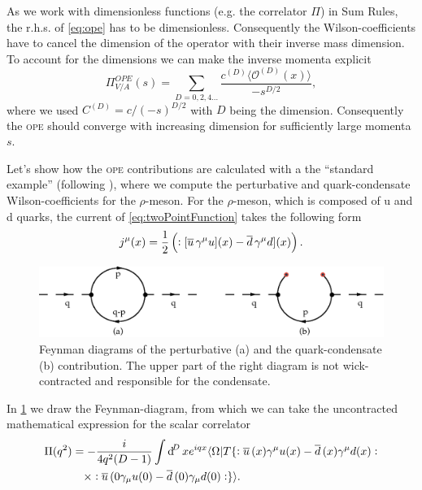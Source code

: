 \documentclass[../../index.tex]{subfiles}
\begin{document}
As we work with dimensionless functions (e.g. the correlator $\Pi$) in Sum
Rules, the r.h.s. of \cref{eq:ope} has to be dimensionless. Consequently the
Wilson-coefficients have to cancel the dimension of the operator with their
inverse mass dimension. To account for the dimensions we can make the inverse
momenta explicit
\begin{equation}
  \Pi_{V/A}^{OPE}(s) = \sum_{D=0,2,4\dots} \frac{c^{(D)} \langle \mathcal{O}^{(D)}(x) \rangle}{-s^{D/2}},
\end{equation}
where we used $C^{(D)}=c/(-s)^{D/2}$ with $D$ being the dimension. Consequently
the \textsc{ope} should converge with increasing dimension for sufficiently
large momenta $s$.

Let's show how the \textsc{ope} contributions are calculated with a the
``standard example'' (following \cite{Pascual1984}), where we compute the
perturbative and quark-condensate Wilson-coefficients for the $\rho$-meson. For
the $\rho$-meson, which is composed of u and d quarks, the current of
\cref{eq:twoPointFunction} takes the following form
\begin{equation}
  j^\mu(x) = \frac{1}{2}\left(:[\overline{u}\, \gamma^\mu u](x) - \overline{d}\, \gamma^\mu d](x)\right).
\end{equation}
\begin{figure}
  \centering
  \includegraphics[width=\textwidth]{./images/condensateFeynmanDiagram.eps}
  \caption{Feynman diagrams of the perturbative (a) and the quark-condensate (b)
    contribution. The upper part of the right diagram is not wick-contracted and
    responsible for the condensate.}
  \label{fig:OPEFeynmanDiagram}
\end{figure}
In \cref{fig:OPEFeynmanDiagram} we draw the Feynman-diagram, from which we can
take the uncontracted mathematical expression for the scalar correlator
\begin{equation}
  \begin{split}
    \Pi(q^2) &= - \frac{i}{4 q^2 (D -1)} \int \dif^D x e^{iqx} \langle \Omega \vert T \{:\anti{u}(x) \gamma^\mu u(x) - \anti{d}(x) \gamma^\mu d(x): \\
    &\quad\times :\anti{u}(0 \gamma_\mu u(0) - \anti{d}(0)\gamma_\mu d(0): \}
    \rangle.
  \end{split}
\end{equation}
\end{document}
